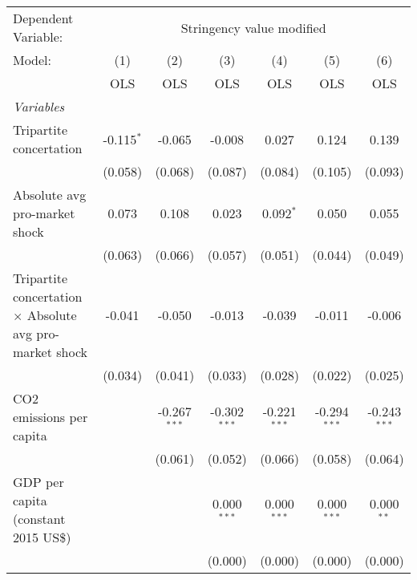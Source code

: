 
\begingroup
\centering
\begin{tabular}{lcccccc}
   \toprule
   Dependent Variable: & \multicolumn{6}{c}{Stringency value modified}\\
   Model:                                                          & (1)          & (2)            & (3)            & (4)            & (5)            & (6)\\  
                                                                   &  OLS         & OLS            & OLS            & OLS            & OLS            & OLS\\  
   \midrule
   \emph{Variables}\\
   Tripartite concertation                                         & -0.115$^{*}$ & -0.065         & -0.008         & 0.027          & 0.124          & 0.139\\   
                                                                   & (0.058)      & (0.068)        & (0.087)        & (0.084)        & (0.105)        & (0.093)\\   
   Absolute avg pro-market shock                                   & 0.073        & 0.108          & 0.023          & 0.092$^{*}$    & 0.050          & 0.055\\   
                                                                   & (0.063)      & (0.066)        & (0.057)        & (0.051)        & (0.044)        & (0.049)\\   
   Tripartite concertation $\times$ Absolute avg pro-market shock  & -0.041       & -0.050         & -0.013         & -0.039         & -0.011         & -0.006\\   
                                                                   & (0.034)      & (0.041)        & (0.033)        & (0.028)        & (0.022)        & (0.025)\\   
   CO2 emissions per capita                                        &              & -0.267$^{***}$ & -0.302$^{***}$ & -0.221$^{***}$ & -0.294$^{***}$ & -0.243$^{***}$\\   
                                                                   &              & (0.061)        & (0.052)        & (0.066)        & (0.058)        & (0.064)\\   
   GDP per capita (constant 2015 US\$)                             &              &                & 0.000$^{***}$  & 0.000$^{***}$  & 0.000$^{***}$  & 0.000$^{**}$\\   
                                                                   &              &                & (0.000)        & (0.000)        & (0.000)        & (0.000)\\   

\end{tabular}
